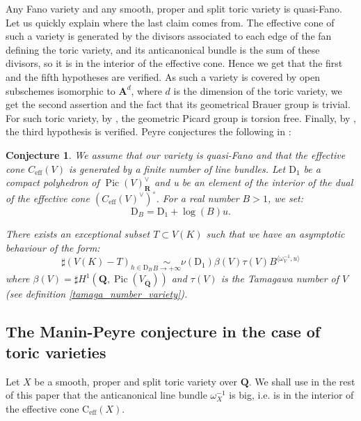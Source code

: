 \documentclass{proc-l}
\newcommand{\R}{\mathbf{R}}
\newcommand{\Q}{\mathbf{Q}}
\newcommand{\cone}{\text{C}_{\text{eff}}(X)}
\DeclareMathOperator{\Pic}{Pic}
\DeclareMathOperator{\eff}{eff}
\newcommand{\affine}{\mathbf{A}}
\newcommand{\w}{\omega}
\newtheorem{conjecture}[theorem]{Conjecture}
\theoremstyle{definition}
\theoremstyle{remark}
\numberwithin{equation}{section}
\begin{document}
Any Fano variety and any smooth, proper and split toric variety is quasi-Fano. Let us quickly explain where the last claim comes from. The effective cone of such a variety is generated by the divisors associated to each edge of the fan defining the toric variety, and its anticanonical bundle is the sum of these divisors, so it is in the interior of the effective cone. Hence we get that the first and the fifth hypotheses are verified. As such a variety is covered by open subschemes isomorphic to $\affine^d$, where $d$ is the dimension of the toric variety, we get the second assertion and the fact that its geometrical Brauer group is trivial. For such toric variety, by \cite[proposition 4.2.5]{CoxLittleSchenck2011}, the geometric Picard group is torsion free. Finally, by \cite[theorem 9.2.3]{CoxLittleSchenck2011}, the third hypothesis is verified. Peyre conjectures the following in \cite[question 4.8]{Peyre_beyond_height}:

\begin{conjecture}\label{manin_peyre_conjecture}
We assume that our variety is quasi-Fano and that the effective cone $C_{\eff}(V)$ is generated by a finite number of line bundles. Let $\mathrm{D}_1$ be a compact polyhedron of $\Pic(V)^{\vee}_{\R}$ and u be an element of the interior of the dual of the effective cone $(C_{\eff}(V)^{\vee})^{\circ}$. For a real number $B > 1$, we set:
$$ \mathrm{D}_B = \mathrm{D}_1 + \log(B) u .$$
 
There exists an exceptional subset $T \subset V(K)$ such that we have an asymptotic behaviour of the form:
$$ \sharp ( V(K)-T )_{h \in \mathrm{D}_B} \underset{B \rightarrow +\infty}{\sim} \nu(\mathrm{D}_1 ) \beta(V) \tau(V) B^{\langle \w_V^{-1},u \rangle}$$ where $\beta(V) = \sharp H^1(\Q,\Pic(V_{\overline{\Q}}))$ and $\tau(V)$ is the Tamagawa number of $V$ (see definition \ref{tamaga_number_variety}).

\end{conjecture}

 



\subsection{The Manin-Peyre conjecture in the case of toric varieties}

Let $X$ be a smooth, proper and split toric variety over $\Q$. We shall use in the rest of this paper that the anticanonical line bundle $\w_X^{-1}$ is big, i.e. is in the interior of the effective cone $\cone$. 
\end{document}
